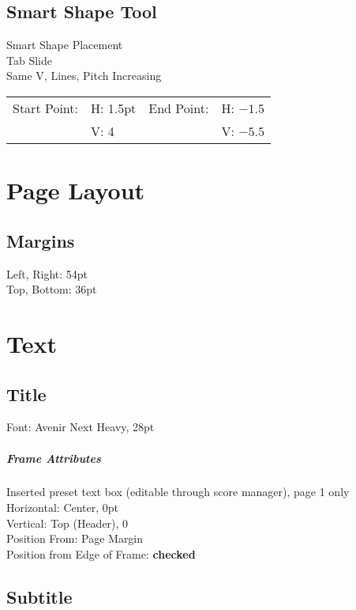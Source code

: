 \documentclass[]{tufte-book} %
\begin{document}
\section{Smart Shape Tool}
Smart Shape Placement\\
Tab Slide\\
Same V, Lines, Pitch Increasing\\
\begin{tabular}{l l l l}
Start Point: & H: 1.5pt & End Point: & H: $-1.5$\\
& V: 4 & & V: $-5.5$\\
\end{tabular}
\chapter{Page Layout}
\section{Margins}
Left, Right: 54pt\\
Top, Bottom: 36pt
\chapter{Text}
\section{Title}
Font: Avenir Next Heavy, 28pt

\paragraph{Frame Attributes}
Inserted preset text box (editable through score manager), page 1 only\\
Horizontal: Center, 0pt\\
Vertical: Top (Header), 0\\
Position From: Page Margin\\
Position from Edge of Frame: \textbf{checked}

\section{Subtitle}
\label{sec:subtitle}
\end{document}
